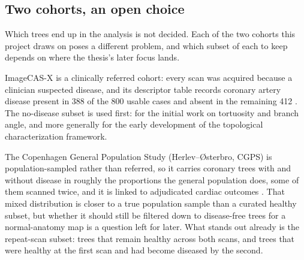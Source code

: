 %

\subsection{Two cohorts, an open choice}
\label{sec:two-cohorts}

Which trees end up in the analysis is not decided. Each of the two cohorts this project draws on
poses a different problem, and which subset of each to keep depends on where the thesis's later
focus lands.

ImageCAS-X is a clinically referred cohort: every scan was acquired because a clinician suspected
disease, and its descriptor table records coronary artery disease present in 388 of the 800 usable
cases and absent in the remaining 412 \cite{bransby2026imagecasx,zeng2023imagecas}. The no-disease
subset is used first: for the initial work on tortuosity and branch angle, and more generally for
the early development of the topological characterization framework.

The Copenhagen General Population Study (Herlev--{\O}sterbro, CGPS) is population-sampled rather
than referred, so it carries coronary trees with and without disease in roughly the proportions the
general population does, some of them scanned twice, and it is linked to adjudicated cardiac
outcomes \cite{fuchs2023cgps}. That mixed distribution is closer to a true population sample than a
curated healthy subset, but whether it should still be filtered down to disease-free trees for a
normal-anatomy map is a question left for later. What stands out already is the repeat-scan
subset: trees that remain healthy across both scans, and trees that were healthy at the first scan
and had become diseased by the second. 